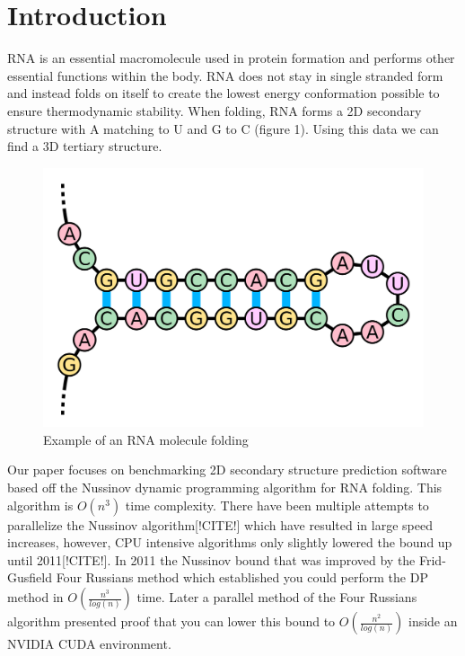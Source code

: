 \documentclass[12pt]{article}
\begin{document}
\section{Introduction}
\par RNA is an essential macromolecule used in protein formation and performs other essential functions within the body\cite{turner}. RNA does not stay in single stranded form and instead folds on itself to create the lowest energy conformation possible to ensure thermodynamic stability\cite{herschlag}. When folding, RNA forms a 2D secondary structure\cite{mccaskill} with A matching to U and G to C (figure 1).  Using this data we can find a 3D tertiary structure\cite{mccaskill}.
\begin{figure}[h!]
  \centering
  \includegraphics[keepaspectratio, scale=0.12]{fold-example.png}
  \caption{Example of an RNA molecule folding}
  \label{fig:RNA Folding}
\end{figure}
\par Our paper focuses on benchmarking 2D secondary structure prediction software based off the Nussinov dynamic programming algorithm\cite{nussinov} for RNA folding. This algorithm is $O(n^3)$ time complexity. There have been multiple attempts to parallelize the Nussinov algorithm[!CITE!] which have resulted in large speed increases, however, CPU intensive algorithms only slightly lowered the bound up until 2011[!CITE!]. In 2011 the Nussinov bound that was improved by the Frid-Gusfield Four Russians method which established you could perform the DP method in $O(\frac{n^3}{log(n)})$ time\cite{gusfield}. Later a parallel method of the Four Russians algorithm presented proof that you can lower this bound to $O(\frac{n^2}{log(n)})$ inside an NVIDIA CUDA environment\cite{balaji}.
\end{document}

